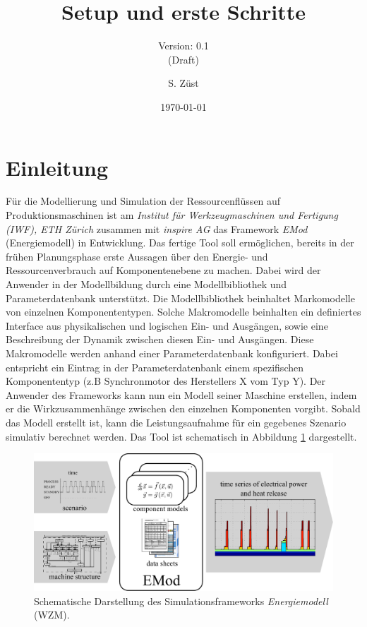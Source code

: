 \documentclass[a4paper,11pt,pdftex,twoside]{scrartcl}
\title{Setup und erste Schritte}
\subtitle{Version: 0.1\\(Draft)}
\author{S. Züst}
\date{\today}
\newcommand{\ethz}{\emph{ETH Zürich}\xspace}
\newcommand{\iwf}{\emph{Institut für Werkzeugmaschinen und Fertigung (IWF), \ethz}\xspace}
\newcommand{\inspire}{\emph{inspire AG}\xspace}
\begin{document}
\maketitle
\thispagestyle{empty} %

\clearpage

\thispagestyle{empty} %
\tableofcontents
\clearpage

\setcounter{page}{1}   %

\section{Einleitung}
Für die Modellierung und Simulation der Ressourcenflüssen auf Produktionsmaschinen ist am \iwf zusammen mit \inspire das Framework \emph{EMod} (Energiemodell) in Entwicklung.
Das fertige Tool soll ermöglichen, bereits in der frühen Planungsphase erste Aussagen über den Energie- und Ressourcenverbrauch auf Komponentenebene zu machen.
Dabei wird der Anwender in der Modellbildung durch eine Modellbibliothek und Parameterdatenbank unterstützt.
Die Modellbibliothek beinhaltet Markomodelle von einzelnen Komponententypen.
Solche Makromodelle beinhalten ein definiertes Interface aus physikalischen und logischen Ein- und Ausgängen, sowie eine Beschreibung der Dynamik zwischen diesen Ein- und Ausgängen.
Diese Makromodelle werden anhand einer Parameterdatenbank konfiguriert. 
Dabei entspricht ein Eintrag in der Parameterdatenbank einem spezifischen Komponententyp (z.B Synchronmotor des Herstellers X vom Typ Y).
Der Anwender des Frameworks kann nun ein Modell seiner Maschine erstellen, indem er die Wirkzusammenhänge zwischen den einzelnen Komponenten vorgibt.
Sobald das Modell erstellt ist, kann die Leistungsaufnahme für ein gegebenes Szenario simulativ berechnet werden.
Das Tool ist schematisch in Abbildung \ref{fig:emod} dargestellt.

\begin{figure}[h]
	\centering
	\includegraphics[width=.8\linewidth]{figures/emod}
	\caption{Schematische Darstellung des Simulationsframeworks \emph{Energiemodell} (WZM).}
	\label{fig:emod}
\end{figure}
\end{document}
